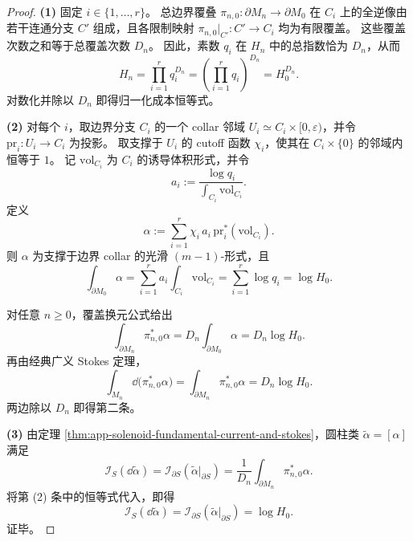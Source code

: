 \begin{proof}
\textbf{(1)}
固定 \(i\in\{1,\dots,r\}\)。
总边界覆叠 \(\pi_{n,0}:\partial M_n\to \partial M_0\) 在 \(C_i\) 上的全逆像由若干连通分支 \(C'\) 组成，且各限制映射
\(
\pi_{n,0}|_{C'}:C'\to C_i
\)
均为有限覆盖。
这些覆盖次数之和等于总覆盖次数 \(D_n\)。
因此，素数 \(q_i\) 在 \(H_n\) 中的总指数恰为 \(D_n\)，从而
\[
H_n=\prod_{i=1}^{r}q_i^{D_n}
=\left(\prod_{i=1}^{r}q_i\right)^{D_n}
=H_0^{D_n}.
\]
对数化并除以 \(D_n\) 即得归一化成本恒等式。

\textbf{(2)}
对每个 \(i\)，取边界分支 \(C_i\) 的一个 collar 邻域 \(U_i\simeq C_i\times[0,\varepsilon)\)，并令
\(
\mathrm{pr}_i:U_i\to C_i
\)
为投影。
取支撑于 \(U_i\) 的 cutoff 函数 \(\chi_i\)，使其在 \(C_i\times\{0\}\) 的邻域内恒等于 \(1\)。
记 \(\mathrm{vol}_{C_i}\) 为 \(C_i\) 的诱导体积形式，并令
\[
a_i:=\frac{\log q_i}{\int_{C_i}\mathrm{vol}_{C_i}}.
\]
定义
\[
\alpha:=\sum_{i=1}^{r}\chi_i\,a_i\,\mathrm{pr}_i^{\ast}(\mathrm{vol}_{C_i}).
\]
则 \(\alpha\) 为支撑于边界 collar 的光滑 \((m-1)\)-形式，且
\[
\int_{\partial M_0}\alpha
=
\sum_{i=1}^{r}a_i\int_{C_i}\mathrm{vol}_{C_i}
=
\sum_{i=1}^{r}\log q_i
=
\log H_0.
\]

对任意 \(n\ge 0\)，覆盖换元公式给出
\[
\int_{\partial M_n}\pi_{n,0}^{\ast}\alpha
=
D_n\int_{\partial M_0}\alpha
=
D_n\log H_0.
\]
再由经典广义 Stokes 定理，
\[
\int_{M_n}\dd\bigl(\pi_{n,0}^{\ast}\alpha\bigr)
=
\int_{\partial M_n}\pi_{n,0}^{\ast}\alpha
=
D_n\log H_0.
\]
两边除以 \(D_n\) 即得第二条。

\textbf{(3)}
由定理 \ref{thm:app-solenoid-fundamental-current-and-stokes}，圆柱类 \(\widetilde{\alpha}=[\alpha]\) 满足
\[
\mathcal I_S(\dd\widetilde{\alpha})
=
\mathcal I_{\partial S}(\widetilde{\alpha}|_{\partial S})
=
\frac{1}{D_n}\int_{\partial M_n}\pi_{n,0}^{\ast}\alpha.
\]
将第 (2) 条中的恒等式代入，即得
\[
\mathcal I_S(\dd\widetilde{\alpha})
=
\mathcal I_{\partial S}(\widetilde{\alpha}|_{\partial S})
=
\log H_0.
\]
证毕。
\end{proof}

\endinput
